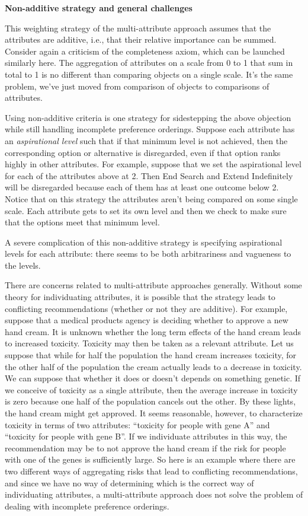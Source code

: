 \documentclass[]{tufte-book}
\begin{document}
\textbf{Non-additive strategy and general challenges}

This weighting strategy of the multi-attribute approach assumes that the attributes are additive, i.e., that their relative importance can be summed. Consider again a criticism of the completeness axiom, which can be launched similarly here. The aggregation of attributes on a scale from 0 to 1 that sum in total to 1 is no different than comparing objects on a single scale. It's the same problem, we've just moved from comparison of objects to comparisons of attributes.

Using non-additive criteria is one strategy for sidestepping the above objection while still handling incomplete preference orderings. Suppose each attribute has an \emph{aspirational level} such that if that minimum level is not achieved, then the corresponding option or alternative is disregarded, even if that option ranks highly in other attributes. For example, suppose that we set the aspirational level for each of the attributes above at 2. Then End Search and Extend Indefinitely will be disregarded because each of them has at least one outcome below 2. Notice that on this strategy the attributes aren't being compared on some single scale. Each attribute gets to set its own level and then we check to make sure that the options meet that minimum level.

A severe complication of this non-additive strategy is specifying aspirational levels for each attribute: there seems to be both arbitrariness and vagueness to the levels.

There are concerns related to multi-attribute approaches generally. Without some theory for individuating attributes, it is possible that the strategy leads to conflicting recommendations (whether or not they are additive). For example, suppose that a medical products agency is deciding whether to approve a new hand cream. It is unknown whether the long term effects of the hand cream leads to increased toxicity. Toxicity may then be taken as a relevant attribute. Let us suppose that while for half the population the hand cream increases toxicity, for the other half of the population the cream actually leads to a decrease in toxicity. We can suppose that whether it does or doesn't depends on something genetic. If we conceive of toxicity as a single attribute, then the average increase in toxicity is zero because one half of the population cancels out the other. By these lights, the hand cream might get approved. It seems reasonable, however, to characterize toxicity in terms of two attributes: ``toxicity for people with gene A'' and ``toxicity for people with gene B''. If we individuate attributes in this way, the recommendation may be to not approve the hand cream if the risk for people with one of the genes is sufficiently large. So here is an example where there are two different ways of aggregating risks that lead to conflicting recommendations, and since we have no way of determining which is the correct way of individuating attributes, a multi-attribute approach does not solve the problem of dealing with incomplete preference orderings.
\end{document}
